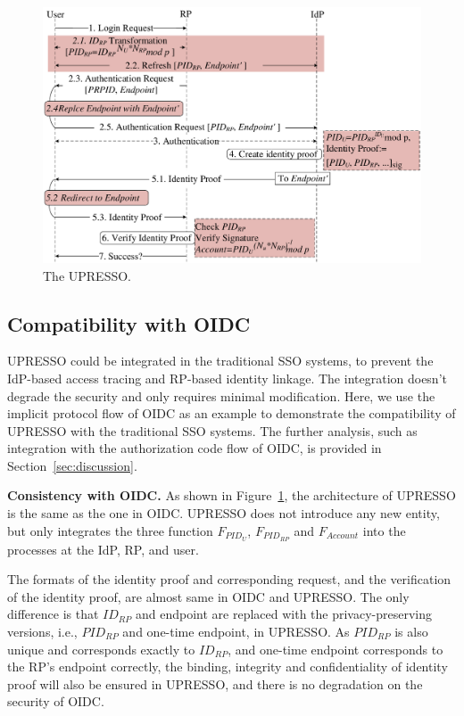 \begin{figure}[t]
  \centering
  \includegraphics[width=\linewidth]{fig/overview1.pdf}
  \caption{The UPRESSO.}
  \label{fig:UPRESSO}
\end{figure}

\subsection{Compatibility with OIDC}
\label{subsec:compatible}
UPRESSO could be integrated in the traditional SSO systems, to  prevent the IdP-based access tracing and RP-based identity linkage.
The integration doesn't degrade the security and only requires minimal modification.
Here, we use the implicit protocol flow of OIDC as an example to demonstrate the compatibility of UPRESSO with the traditional SSO systems.
The further analysis, such as integration with the authorization code flow of OIDC,  is provided in Section~\ref{sec:discussion}.


\vspace{1mm}\noindent \textbf{Consistency with OIDC.}
As shown in Figure~\ref{fig:UPRESSO}, the architecture of UPRESSO is the same as the one in OIDC. UPRESSO does not introduce any new entity, but only integrates the three function $F_{PID_U}$, $F_{PID_{RP}}$ and $F_{Account}$ into the processes at the IdP, RP, and user.

The formats of the  identity proof and corresponding request, and the verification of the identity proof,  are almost same in OIDC and UPRESSO.
The only difference is that $ID_{RP}$ and endpoint are replaced with the privacy-preserving versions, i.e., $PID_{RP}$ and one-time endpoint, in UPRESSO.
As $PID_{RP}$ is also unique and corresponds exactly to $ID_{RP}$, and one-time endpoint corresponds to the RP's endpoint correctly,
 the binding, integrity and confidentiality of identity proof will also be ensured in UPRESSO, and there is no degradation on the security of OIDC.

